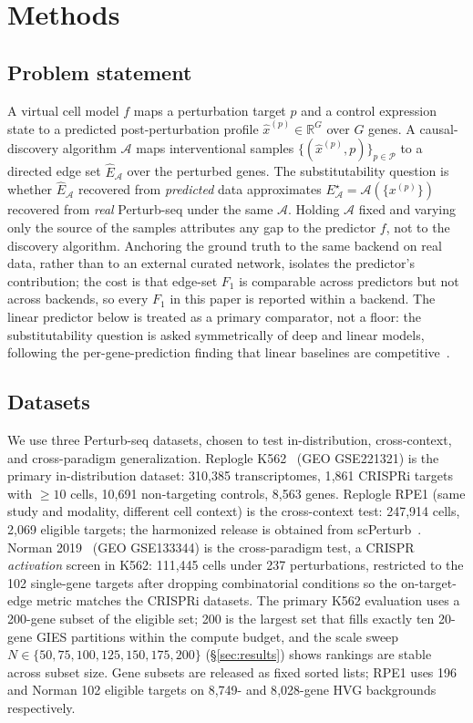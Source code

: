 \documentclass{article}
\theoremstyle{plain}
\theoremstyle{definition}
\theoremstyle{remark}
\begin{document}
\section{Methods}
\label{sec:methods}

\subsection{Problem statement}
A virtual cell model $f$ maps a perturbation target $p$ and a control expression state to a predicted post-perturbation profile $\hat{x}^{(p)}\in\mathbb{R}^{G}$ over $G$ genes. A causal-discovery algorithm $\mathcal{A}$ maps interventional samples $\{(\hat{x}^{(p)},p)\}_{p\in\mathcal{P}}$ to a directed edge set $\hat{E}_{\mathcal{A}}$ over the perturbed genes. The substitutability question is whether $\hat{E}_{\mathcal{A}}$ recovered from \emph{predicted} data approximates $E^{\star}_{\mathcal{A}}=\mathcal{A}(\{x^{(p)}\})$ recovered from \emph{real} Perturb-seq under the same $\mathcal{A}$. Holding $\mathcal{A}$ fixed and varying only the source of the samples attributes any gap to the predictor $f$, not to the discovery algorithm. Anchoring the ground truth to the same backend on real data, rather than to an external curated network, isolates the predictor's contribution; the cost is that edge-set $F_1$ is comparable across predictors but not across backends, so every $F_1$ in this paper is reported within a backend. The linear predictor below is treated as a primary comparator, not a floor: the substitutability question is asked symmetrically of deep and linear models, following the per-gene-prediction finding that linear baselines are competitive~\citep{ahlmanneltze2025}.

\subsection{Datasets}
We use three Perturb-seq datasets, chosen to test in-distribution, cross-context, and cross-paradigm generalization. Replogle K562~\citep{replogle2022} (GEO GSE221321) is the primary in-distribution dataset: 310{,}385 transcriptomes, 1{,}861 CRISPRi targets with $\geq 10$ cells, 10{,}691 non-targeting controls, 8{,}563 genes. Replogle RPE1 (same study and modality, different cell context) is the cross-context test: 247{,}914 cells, 2{,}069 eligible targets; the harmonized release is obtained from scPerturb~\citep{peidli2024scperturb}. Norman 2019~\citep{norman2019} (GEO GSE133344) is the cross-paradigm test, a CRISPR \emph{activation} screen in K562: 111{,}445 cells under 237 perturbations, restricted to the 102 single-gene targets after dropping combinatorial conditions so the on-target-edge metric matches the CRISPRi datasets. The primary K562 evaluation uses a 200-gene subset of the eligible set; 200 is the largest set that fills exactly ten 20-gene GIES partitions within the compute budget, and the scale sweep $N\in\{50,75,100,125,150,175,200\}$ (\S\ref{sec:results}) shows rankings are stable across subset size. Gene subsets are released as fixed sorted lists; RPE1 uses 196 and Norman 102 eligible targets on 8{,}749- and 8{,}028-gene HVG backgrounds respectively.
\end{document}
